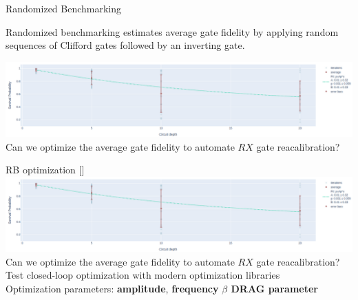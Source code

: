 \documentclass[aspectratio=169,10pt]{beamer}
\begin{document}
\begin{frame}[t,fragile]{Randomized Benchmarking}
\begin{center}
  Randomized benchmarking estimates average gate fidelity by applying random sequences of Clifford gates followed by an inverting gate.
  \vspace{1.25em}

  \includegraphics[width=\textwidth]{figures/rb.png}
  \vspace{1.25em}
  Can we optimize the average gate fidelity to automate $RX$ gate reacalibration? 
\end{center}
\end{frame}

\begin{frame}[t,fragile]{RB optimization [\cite{kelly_optimal_2014}]}
  \includegraphics[width=\textwidth]{figures/rb.png}\\
  \vspace{1em}
  Can we optimize the average gate fidelity to automate $RX$ gate reacalibration?\\
  \vspace{1em}
  Test closed-loop optimization with modern optimization libraries\\

  \vspace{1em}
  Optimization parameters: \; \textbf{amplitude}, \; \textbf{frequency} \; \textbf{$\beta$ DRAG parameter}
\end{frame}
\end{document}
